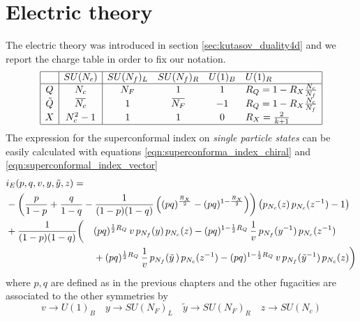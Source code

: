 \section{Electric theory}
The electric theory was introduced in section \ref{sec:kutasov_duality4d} and we report the charge table in order to fix our notation.
\begin{equation}
\begin{array}{| c | c | c c c l | }
\hline
 & SU(N_c) &SU(N_f)_L  &SU(N_f)_R   & U(1)_B &  U(1)_R \\
\hline
Q & N_c&N_F & 1   &  1  & R_Q =  1 - 
R_X %
 \frac{N_c}{N_f}  \\
\tilde{Q} & \overbar{N_c} &  1 & \overbar{ N_F}   & -1   &   R_Q = 1 -
 R_X %
  \frac{N_c}{N_f}    \\
X & N_c^2-1 & 1   & 1    & 0   &  R_X = \frac{2}{k+1} \\
\hline
\end{array}
\centering
\end{equation}
The expression for the superconformal index on \emph{single particle states} can be easily calculated with equations \eqref{eqn:superconforma_index_chiral} and \eqref{eqn:superconformal_index_vector}
\begin{equation}
\begin{aligned}
 & i_E (p,q,v, y,\tilde y ,z) = \\ 
 & 
  -\left({p \over 1-p}+{q \over 1-q} -{1 \over (1-p)(1-q)}
\left((p q)^{\frac{R_X}{2}}- (p q)^{1-\frac{R_X}{2}}\right)
\right) \left( p_{N_c}( z)\, p_{N_c}(z^{-1})-1\right ) \\ 
&
\begin{aligned}
&
+{1\over (1-p)(1-q)}
\bigg(
&&(p q)^{{1\over 2}R_Q} \, v \, p_{N_f}(y)\, p_{N_c}(z)
- (p q)^{1- {1\over 2}R_Q} \, {1 \over v}\, p_{{N_f}}(y^{-1})\, p_{{N_c}}(z^{-1}) \\
&
 && +
(p q)^{{1\over 2}R_Q}\, {1\over v}\, p_{{N_f}}({\tilde y}\,) \, p_{{N_c}}(z^{-1})
- (p q)^{1- {1\over 2}R_Q} \, v\, p_{N_f}({\tilde y}^{-1})\, p_{N_c}(z)\bigg) \\
\end{aligned}
\end{aligned}\label{eqn:superconf_index_electric}
\end{equation}
where $ p,q$ are defined as in the previous chapters and the other fugacities are associated to the other symmetries by
\begin{equation}
v \rightarrow U(1)_B \quad y \rightarrow SU(N_F)_L \quad \tilde{y} \rightarrow SU(N_F)_R \quad z \rightarrow SU(N_c) 
\end{equation}
